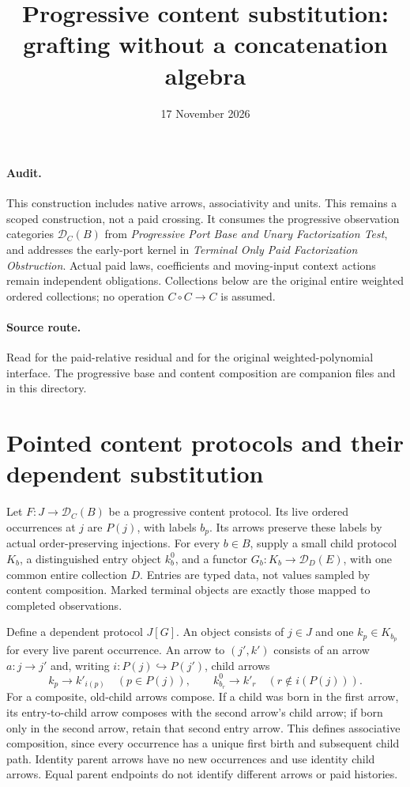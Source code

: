\documentclass[11pt]{article}
\title{Progressive content substitution: grafting without a concatenation algebra}
\date{17 November 2026}
\begin{document}
\maketitle
\paragraph{Audit.} This construction includes native arrows, associativity and units. This remains a scoped construction, not a paid crossing. It consumes the progressive observation categories $\mathcal D_C(B)$ from \emph{Progressive Port Base and Unary Factorization Test}, and addresses the early-port kernel in \emph{Terminal Only Paid Factorization Obstruction}. Actual paid laws, coefficients and moving-input context actions remain independent obligations. Collections below are the original entire weighted ordered collections; no operation $C\circ C\to C$ is assumed.

\paragraph{Source route.} Read \texttt{} for the paid-relative residual and \texttt{} for the original weighted-polynomial interface. The progressive base and content composition are companion files \texttt{} and \texttt{} in this directory.

\section{Pointed content protocols and their dependent substitution}
Let $F:J\to\mathcal D_C(B)$ be a progressive content protocol. Its live ordered occurrences at $j$ are $P(j)$, with labels $b_p$. Its arrows preserve these labels by actual order-preserving injections. For every $b\in B$, supply a small child protocol $K_b$, a distinguished entry object $k_b^0$, and a functor $G_b:K_b\to\mathcal D_D(E)$, with one common entire collection $D$. Entries are typed data, not values sampled by content composition. Marked terminal objects are exactly those mapped to completed observations.

Define a dependent protocol $J[G]$. An object consists of $j\in J$ and one $k_p\in K_{b_p}$ for every live parent occurrence. An arrow to $(j',k')$ consists of an arrow $a:j\to j'$ and, writing $i:P(j)\hookrightarrow P(j')$, child arrows
\[
 k_p\to k'_{i(p)}\quad(p\in P(j)),\qquad
 k^0_{b_r}\to k'_r\quad(r\notin i(P(j))).                 \tag{1}
\]
For a composite, old-child arrows compose. If a child was born in the first arrow, its entry-to-child arrow composes with the second arrow's child arrow; if born only in the second arrow, retain that second entry arrow. This defines associative composition, since every occurrence has a unique first birth and subsequent child path. Identity parent arrows have no new occurrences and use identity child arrows. Equal parent endpoints do not identify different arrows or paid histories.
\end{document}
